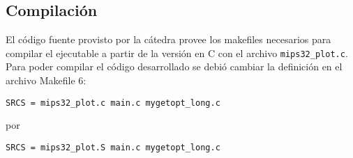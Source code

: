 \documentclass[10pt,a4paper]{article}
\begin{document}
\begin{comment}
48  & cpi                \\ \cline{2-2} 
44  & cpr                \\ \cline{2-2} 
40  & res                \\ \cline{2-2} 
36  & c                \\ \cline{2-2} 
32  & y                \\ \cline{2-2} 
28  & x                \\ \cline{2-2} 
24  & absz                \\ \cline{2-2} 
20  & si                \\ \cline{2-2} 
16  & sr                \\ \cline{2-2} 
12  & zi                \\ \cline{2-2} 
8  &  zr                \\ \cline{2-2} 
4  &  ci                \\ \cline{2-2} 
0  &  cr                \\ \cline{2-2} 
\end{tabular}
\caption{\textit{Stack frame} de la función \texttt{mips32\_plot()}. Las palabras 60 a 72 corresponden al \textit{Stack frame} de la función \texttt{caller}, las palabras en negrita corresponden a la \textit{General Register Save Area} y los restantes a la \textit{Local and Temporary Variables Area}.}
\end{table}
\end{comment}

\subsection{Compilación}
El código fuente provisto por la cátedra provee los makefiles necesarios para compilar el
ejecutable a partir de la versión en C con el archivo \texttt{mips32\_plot.c}. Para poder compilar el
código desarrollado se debió cambiar la definición en el archivo Makefile 6:

\texttt{SRCS = mips32\_plot.c main.c mygetopt\_long.c}

por

\texttt{SRCS = mips32\_plot.S main.c mygetopt\_long.c}
\end{document}
